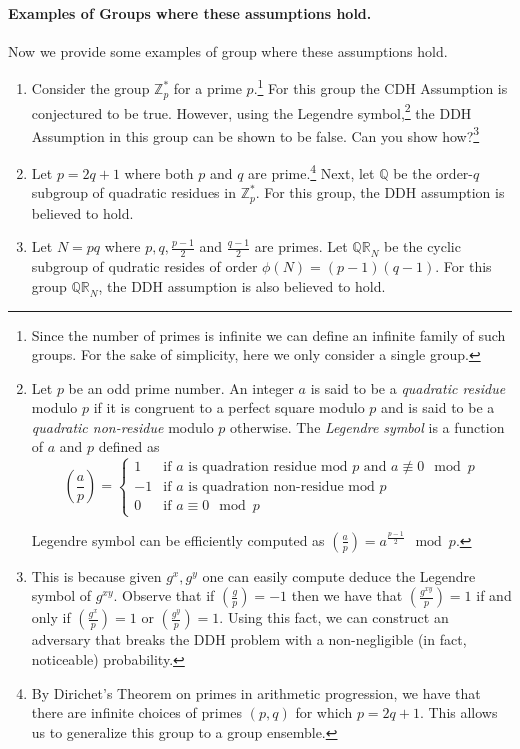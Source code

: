 \documentclass[12pt]{tufte-book}
\begin{document}
\paragraph{Examples of Groups where these assumptions hold.} Now we provide some examples of group where these assumptions hold. 
\begin{enumerate}
    \item Consider the group $\mathbb{Z}_p^*$ for a prime $p$.\footnote{Since the number of primes is infinite we can define an infinite family of such groups. For the sake of simplicity, here we only consider a single group.} For this group the CDH Assumption is conjectured to be true. However, using the Legendre symbol,\footnote{Let $p$ be an odd prime number. An integer $a$ is said to be a \emph{quadratic residue} modulo $p$ if it is congruent to a perfect square modulo $p$ and  is said to be a \emph{quadratic non-residue} modulo $p$ otherwise. The \emph{Legendre symbol} is a function of $a$ and $p$ defined as
    \begin{equation*}
        \left(\frac{a}{p}\right) = \begin{cases}
    1 &\text{if $a$ is quadration residue mod $p $ and $a \not\equiv 0 \mod p$}\\
    -1 &\text{if $a$ is quadration non-residue mod $p $}\\
    0 &\text{if $a \equiv 0 \mod p $}
    \end{cases}
    \end{equation*}

Legendre symbol can be efficiently computed as $\left(\frac{a}{p}\right) = a^{\frac{p-1}{2}}\mod p$.} 
the DDH Assumption in this group can be shown to be false. Can you show how?\footnote{This is because given $g^x, g^y$ one can easily compute deduce the Legendre symbol of $g^{xy}$.  Observe that if $\left(\frac{g}{p}\right) = -1$ then we have that $\left(\frac{g^{xy}}{p}\right) = 1$ if and only if $ \left(\frac{g^x}{p}\right) =1 $ or $\left(\frac{g^y}{p}\right) = 1$. Using this fact, we can construct an adversary that breaks the DDH problem with a non-negligible (in fact, noticeable) probability.}
\item Let $p = 2q+1$ where both $p$ and $q$ are prime.\footnote{By Dirichet's Theorem on primes in arithmetic progression, we have that there are infinite choices of primes $(p,q)$ for which $p = 2q+1$. This allows us to generalize this group to a group ensemble.} Next, let $\mathbb{Q}$ be the order-$q$ subgroup of quadratic residues in $\mathbb{Z}^*_p$. For this group, the DDH assumption is believed to hold. 
\item Let $N = pq$ where $p,q, \frac{p-1}{2}$ and $\frac{q-1}{2}$ are primes. Let $\mathbb{QR}_N$ be the cyclic subgroup of qudratic resides of order $\phi(N) = (p-1)(q-1)$. For this group $\mathbb{QR}_N$, the DDH assumption is also believed to hold.
\end{enumerate}
\end{document}
